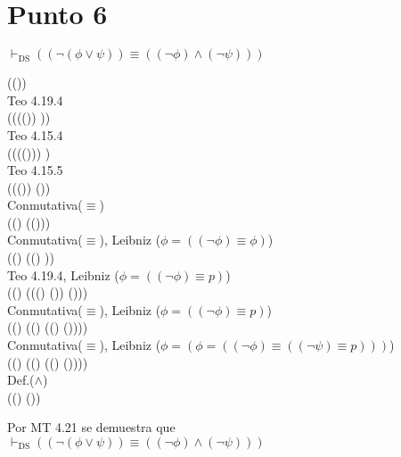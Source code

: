 \documentclass{article}
\begin{document}
\section{Punto 6}
\begin{logicenv}[2]{$\vdash_{\text{DS}} ((\neg  (\phi \lor \psi)) \equiv ((\neg \phi) \land (\neg \psi)))$}
    \begin{derivation}
        (\neg(\phi \lor \psi))\\
        Teo 4.19.4\\
        (\neg ((\phi \lor (\neg \psi)) \equiv \phi))\\
        Teo 4.15.4\\
        ((\neg(\phi \lor (\neg \psi))) \equiv \phi)\\
        Teo 4.15.5\\
        ((\phi \lor (\neg \psi)) \equiv (\neg \phi))\\
        Conmutativa($\equiv$)\\
        ((\neg \phi) \equiv (\phi \lor (\neg \psi)))\\
        Conmutativa($\equiv$), Leibniz ($\phi = ((\neg \phi) \equiv \phi)$)\\
        ((\neg \phi) \equiv ((\neg \psi) \lor \phi))\\
        Teo 4.19.4, Leibniz ($\phi = ((\neg \phi) \equiv p)$)\\
        ((\neg \phi) \equiv (((\neg \psi) \lor (\neg \phi)) \equiv (\neg \psi)))\\
        Conmutativa($\equiv$), Leibniz ($\phi = ((\neg \phi) \equiv p)$)\\
        ((\neg \phi) \equiv ((\neg \psi) \equiv ((\neg \psi) \lor (\neg \phi))))\\
        Conmutativa($\equiv$), Leibniz ($\phi = (\phi = ((\neg \phi) \equiv ((\neg \psi) \equiv p)))$)\\
        ((\neg \phi) \equiv ((\neg \psi) \equiv ((\neg \phi) \lor (\neg \psi))))\\
        Def.($\land$)\\
        ((\neg \phi) \land (\neg \psi))
    \end{derivation}
    Por MT 4.21 se demuestra que\\
    $\vdash_{\text{DS}} ((\neg  (\phi \lor \psi)) \equiv ((\neg \phi) \land (\neg \psi)))$
\end{logicenv}
\end{document}
